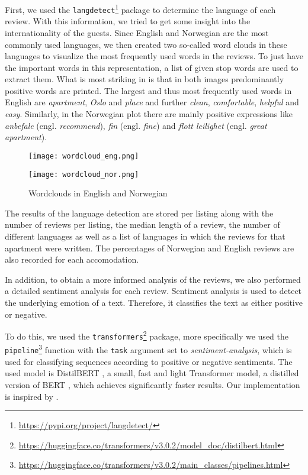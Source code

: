 First, we used the \texttt{langdetect}\footnote{\url{https://pypi.org/project/langdetect/}} package to determine the language of each review.
With this information, we tried to get some insight into the internationality of the guests.
Since English and Norwegian are the most commonly used languages, we then created two so-called word clouds in these languages to visualize the most frequently used words in the reviews.
To just have the important words in this representation, a list of given stop words are used to extract them.
What is most striking in  is that in both images predominantly positive words are printed.
The largest and thus most frequently used words in English are \textit{apartment}, \textit{Oslo} and \textit{place} and further \textit{clean}, \textit{comfortable}, \textit{helpful} and \textit{easy}.
Similarly, in the Norwegian plot there are mainly positive expressions like \textit{anbefale} (engl. \emph{recommend}), \textit{fin} (engl. \emph{fine}) and \textit{flott leilighet} (engl. \emph{great apartment}).

\begin{figure}[t]
  \centering
  \begin{minipage}{6.7cm}
    \texttt{[image: wordcloud\_eng.png]}
  \end{minipage}
  \begin{minipage}{6.7cm}
    \texttt{[image: wordcloud\_nor.png]}
  \end{minipage}
  \caption{Wordclouds in English and Norwegian}
  \label{fig:wordclouds}
\end{figure}

The results of the language detection are stored per listing along with the number of reviews per listing, the median length of a review, the number of different languages as well as a list of languages in which the reviews for that apartment were written.
The percentages of Norwegian and English reviews are also recorded for each accomodation.

In addition, to obtain a more informed analysis of the reviews, we also performed a detailed sentiment analysis for each review.
Sentiment analysis is used to detect the underlying emotion of a text.
Therefore, it classifies the text as either positive or negative.

To do this, we used the \texttt{transformers}\footnote{\url{https://huggingface.co/transformers/v3.0.2/model_doc/distilbert.html}} package, more specifically we used the \texttt{pipeline}\footnote{\url{https://huggingface.co/transformers/v3.0.2/main_classes/pipelines.html}} function with the \texttt{task} argument set to \textit{sentiment-analysis}, which is used for classifying sequences according to positive or negative sentiments.
The used model is DistilBERT \citep{sanh2020}, a small, fast and light Transformer model, a distilled version of BERT \citep{devlin2019}, which achieves significantly faster results.
Our implementation is inspired by \citep{selvaraj2020}.

